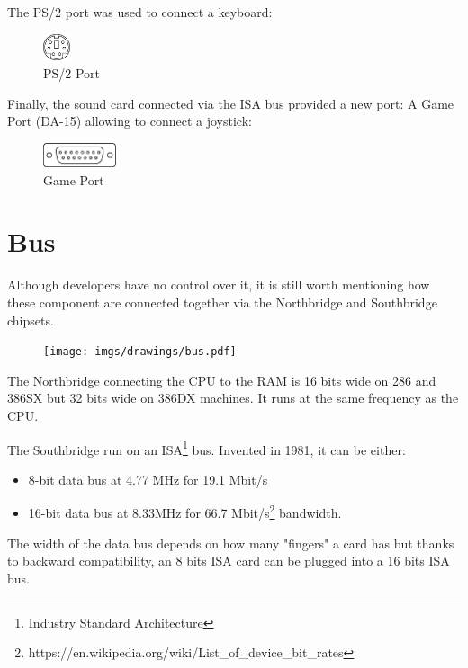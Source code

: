 \documentclass[book.tex]{subfiles}
\begin{document}
The PS/2 port was used to connect a keyboard:
 \begin{figure}[H]
\centering
\includegraphics[width=0.07\textwidth]{imgs/drawings/ports/MiniDIN-6_PS2.eps}
\caption{PS/2 Port}
\label{fig:ps2Port}
\end{figure}


Finally, the sound card connected via the ISA bus provided a new port: A Game Port (DA-15) allowing to connect a joystick:
 \begin{figure}[H]
\centering
\includegraphics[width=0.19\textwidth]{imgs/drawings/ports/DA-15_GamePort.eps}
\caption{Game Port}
\label{fig:gamePort}
\end{figure}


\section{Bus}
Although developers have no control over it, it is still worth mentioning how these component are connected together via the Northbridge and Southbridge chipsets.\\ 
\par
\begin{figure}[H]
\centering
      \texttt{[image: imgs/drawings/bus.pdf]}
\end{figure}
\par
The Northbridge connecting the CPU to the RAM is 16 bits wide on 286 and 386SX but 32 bits wide on 386DX machines. It runs at the same frequency as the CPU.\\
\par
The Southbridge run on an ISA\footnote{Industry Standard Architecture} bus. Invented in 1981, it can be either:
\begin{itemize}
\item 8-bit data bus at 4.77 MHz  for 19.1 Mbit/s
\item 16-bit data bus at 8.33MHz for 66.7 Mbit/s\footnote{https://en.wikipedia.org/wiki/List\_of\_device\_bit\_rates} bandwidth.
\end{itemize}
The width of the data bus depends on how many "fingers" a card has but thanks to backward compatibility, an 8 bits ISA card can be plugged into a 16 bits ISA bus.\\
\par
\end{document}
